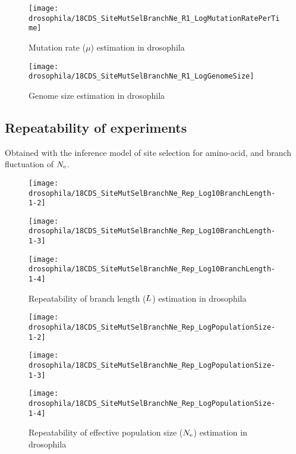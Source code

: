 \begin{figure}[H]
    \centering
    \texttt{[image: drosophila/18CDS\_SiteMutSelBranchNe\_R1\_LogMutationRatePerTime]}
    \caption[Mutation rate estimation in drosophila]{Mutation rate ($\mu$) estimation in drosophila}
\end{figure}

\begin{figure}[H]
    \centering
    \texttt{[image: drosophila/18CDS\_SiteMutSelBranchNe\_R1\_LogGenomeSize]}
    \caption[Genome size estimation in drosophila]{Genome size estimation in drosophila}
\end{figure}

\subsection{Repeatability of experiments}
Obtained with the inference model of site selection for amino-acid, and branch fluctuation of $N_{\mathrm{e}}$.

\begin{figure}[H]
    \centering
    \begin{minipage}{0.32\linewidth}
        \texttt{[image: drosophila/18CDS\_SiteMutSelBranchNe\_Rep\_Log10BranchLength-1-2]}
    \end{minipage} \hfill
    \begin{minipage}{0.32\linewidth}
        \texttt{[image: drosophila/18CDS\_SiteMutSelBranchNe\_Rep\_Log10BranchLength-1-3]}
    \end{minipage} \hfill
    \begin{minipage}{0.32\linewidth}
        \texttt{[image: drosophila/18CDS\_SiteMutSelBranchNe\_Rep\_Log10BranchLength-1-4]}
    \end{minipage}
    \caption[Repeatability of branch length estimation in drosophila]{Repeatability of branch length ($L$) estimation in drosophila}
\end{figure}

\begin{figure}[H]
    \centering
    \begin{minipage}{0.32\linewidth}
        \texttt{[image: drosophila/18CDS\_SiteMutSelBranchNe\_Rep\_LogPopulationSize-1-2]}
    \end{minipage} \hfill
    \begin{minipage}{0.32\linewidth}
        \texttt{[image: drosophila/18CDS\_SiteMutSelBranchNe\_Rep\_LogPopulationSize-1-3]}
    \end{minipage} \hfill
    \begin{minipage}{0.32\linewidth}
        \texttt{[image: drosophila/18CDS\_SiteMutSelBranchNe\_Rep\_LogPopulationSize-1-4]}
    \end{minipage}
    \caption[Repeatability of {effective population size} estimation in drosophila]{Repeatability of {effective population size} ($N_{\mathrm{e}}$) estimation in drosophila}
\end{figure}

